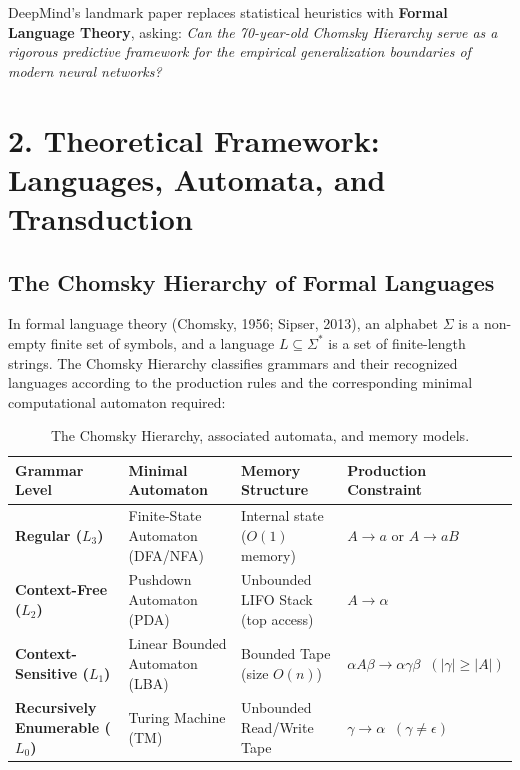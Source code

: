 \documentclass[11pt,a4paper]{article}
\begin{document}
DeepMind's landmark paper replaces statistical heuristics with \textbf{Formal Language Theory}, asking: \textit{Can the 70-year-old Chomsky Hierarchy serve as a rigorous predictive framework for the empirical generalization boundaries of modern neural networks?}

\section{2. Theoretical Framework: Languages, Automata, and Transduction}

\subsection{The Chomsky Hierarchy of Formal Languages}
In formal language theory (Chomsky, 1956; Sipser, 2013), an alphabet $\Sigma$ is a non-empty finite set of symbols, and a language $L \subseteq \Sigma^*$ is a set of finite-length strings. The Chomsky Hierarchy classifies grammars and their recognized languages according to the production rules and the corresponding minimal computational automaton required:

\begin{table}[htbp]
\centering
\small
\renewcommand{\arraystretch}{1.25}
\begin{tabularx}{\linewidth}{p{2.4cm} p{3.2cm} p{3.4cm} X}
\toprule
\rowcolor{gimpaheader}
\textbf{Grammar Level} & \textbf{Minimal Automaton} & \textbf{Memory Structure} & \textbf{Production Constraint} \\
\midrule
\textbf{Regular ($L_3$)} & Finite-State Automaton (DFA/NFA) & Internal state ($O(1)$ memory) & $A \to a$ or $A \to aB$ \\
\rowcolor{gimpalight}
\textbf{Context-Free ($L_2$)} & Pushdown Automaton (PDA) & Unbounded LIFO Stack (top access) & $A \to \alpha$ \\
\textbf{Context-Sensitive ($L_1$)} & Linear Bounded Automaton (LBA) & Bounded Tape (size $O(n)$) & $\alpha A \beta \to \alpha \gamma \beta \;\; (|\gamma| \ge |A|)$ \\
\rowcolor{gimpalight}
\textbf{Recursively Enumerable ($L_0$)} & Turing Machine (TM) & Unbounded Read/Write Tape & $\gamma \to \alpha \;\; (\gamma \neq \epsilon)$ \\
\bottomrule
\end{tabularx}
\caption{The Chomsky Hierarchy, associated automata, and memory models.}
\label{tab:chomsky}
\end{table}
\end{document}
